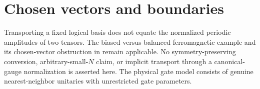 \documentclass{article}
\begin{document}
\section{Chosen vectors and boundaries}
Transporting a fixed logical basis does not equate the normalized periodic
amplitudes of two tensors. The biased-versus-balanced ferromagnetic example
and its chosen-vector obstruction in
\cite{gap:mswc24_same_phase_compatible_seed} remain applicable. No
symmetry-preserving conversion, arbitrary-small-$N$ claim, or implicit
transport through a canonical-gauge normalization is asserted here.
The physical gate model consists of genuine nearest-neighbor unitaries
with unrestricted gate parameters.



\end{document}
